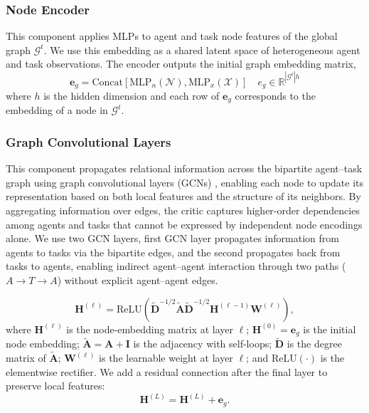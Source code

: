 \subsubsection{\textbf{Node Encoder}}\label{node_encoder}
This component applies MLPs to agent and task node features of the global graph $\mathcal{G}^t$. We use this embedding as a shared latent space of heterogeneous agent and task observations.
The encoder outputs the initial graph 
embedding matrix,
\begin{equation}
\mathbf{e}_g = \text{Concat}[\text{MLP}_{n}\left ( \mathcal{N} \right ), \text{MLP}_x\left(\mathcal{X} \right )]\quad e_g\in\mathbb{R}^{|\mathcal{G}^t| h}
\end{equation}
where $h$ is the hidden dimension and each row of $\mathbf{e}_g$ corresponds 
to the embedding of a node in $\mathcal{G}^t$.



\subsubsection{\textbf{Graph Convolutional Layers}}\label{gcn}
This component propagates relational information across the bipartite agent–task graph using graph convolutional layers (GCNs) \cite{kipf2016semi}, enabling each node to update its representation based on both local features and the structure of its neighbors. By aggregating information over edges, the critic captures higher-order dependencies among agents and tasks that cannot be expressed by independent node encodings alone. We use two GCN layers, first GCN layer propagates information from agents to tasks via the bipartite edges, and the second propagates back from tasks to agents, enabling indirect agent–agent interaction through two paths ($A\!\to\!T\!\to\!A$) without explicit agent–agent edges. 

\begin{equation} \label{eq:gcn}
\mathbf{H}^{(\ell)} = \text{ReLU}\!\left(\tilde{\mathbf{D}}^{-1/2} \tilde{\mathbf{A}} \tilde{\mathbf{D}}^{-1/2} \mathbf{H}^{(\ell-1)} \mathbf{W}^{(\ell)} \right),
\end{equation}
\noindent where \(\mathbf{H}^{(\ell)}\) is the node-embedding matrix at layer \(\ell\);
\(\mathbf{H}^{(0)}=\mathbf{e}_g\) is the initial node embedding;
\(\tilde{\mathbf{A}}=\mathbf{A}+\mathbf{I}\) is the adjacency with self-loops;
\(\tilde{\mathbf{D}}\) is the degree matrix of \(\tilde{\mathbf{A}}\);
\(\mathbf{W}^{(\ell)}\) is the learnable weight at layer \(\ell\);
and \(\mathrm{ReLU}(\cdot)\) is the elementwise rectifier.
We add a residual connection after the final layer to preserve local features:
\begin{equation}
\mathbf{H}^{(L)} = \mathbf{H}^{(L)} + \mathbf{e}_g.
\end{equation}



